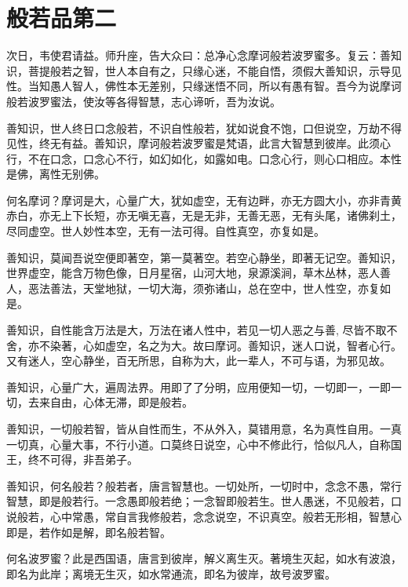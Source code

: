 \documentclass[12pt,twoside,openany]{book}
\begin{document}
\chapter{般若品第二}
次日，韦使君请益。师升座，告大众曰：总净心念摩诃般若波罗蜜多。复云：善知识，{\color{red}菩提般若之智，世人本自有之，只缘心迷，不能自悟，须假大善知识，示导见性。}当知愚人智人，佛性本无差别，只缘迷悟不同，所以有愚有智。吾今为说摩诃般若波罗蜜法，使汝等各得智慧，志心谛听，吾为汝说。

善知识，世人终日口念般若，不识自性般若，犹如说食不饱，口但说空，万劫不得见性，终无有益。善知识，摩诃般若波罗蜜是梵语，此言大智慧到彼岸。此须心行，不在口念，口念心不行，如幻如化，如露如电。口念心行，则心口相应。本性是佛，离性无别佛。

何名摩诃？摩诃是大，心量广大，犹如虚空，无有边畔，亦无方圆大小，亦非青黄赤白，亦无上下长短，亦无嗔无喜，无是无非，无善无恶，无有头尾，诸佛刹土，尽同虚空。世人妙性本空，无有一法可得。自性真空，亦复如是。

善知识，莫闻吾说空便即著空，第一莫著空。若空心静坐，即著无记空。善知识，世界虚空，能含万物色像，日月星宿，山河大地，泉源溪涧，草木丛林，恶人善人，恶法善法，天堂地狱，一切大海，须弥诸山，总在空中，世人性空，亦复如是。

善知识，自性能含万法是大，万法在诸人性中，若见一切人恶之与善, 尽皆不取不舍，亦不染著，心如虚空，名之为大。故曰摩诃。善知识，迷人口说，智者心行。又有迷人，空心静坐，百无所思，自称为大，此一辈人，不可与语，为邪见故。

善知识，心量广大，遍周法界。用即了了分明，应用便知一切，一切即一，一即一切，去来自由，心体无滞，即是般若。

善知识，一切般若智，皆从自性而生，不从外入，莫错用意，名为真性自用。一真一切真，心量大事，不行小道。口莫终日说空，心中不修此行，恰似凡人，自称国王，终不可得，非吾弟子。

善知识，何名般若？般若者，唐言智慧也。一切处所，一切时中，念念不愚，常行智慧，即是般若行。一念愚即般若绝；一念智即般若生。世人愚迷，不见般若，口说般若，心中常愚，常自言我修般若，念念说空，不识真空。般若无形相，智慧心即是，若作如是解，即名般若智。

何名波罗蜜？此是西国语，唐言到彼岸，解义离生灭。著境生灭起，如水有波浪，即名为此岸；离境无生灭，如水常通流，即名为彼岸，故号波罗蜜。
\end{document}
